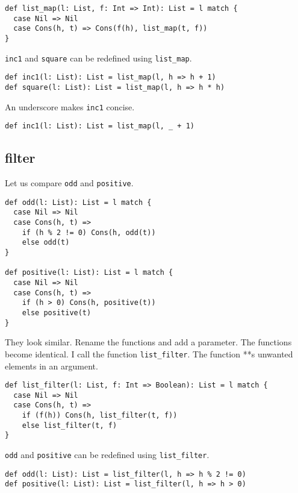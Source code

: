 \begin{verbatim}
def list_map(l: List, f: Int => Int): List = l match {
  case Nil => Nil
  case Cons(h, t) => Cons(f(h), list_map(t, f))
}
\end{verbatim}

\verb!inc1! and \verb!square! can be redefined using \verb!list_map!.

\begin{verbatim}
def inc1(l: List): List = list_map(l, h => h + 1)
def square(l: List): List = list_map(l, h => h * h)
\end{verbatim}

An underscore makes \verb!inc1! concise.

\begin{verbatim}
def inc1(l: List): List = list_map(l, _ + 1)
\end{verbatim}

\subsection{filter}

Let us compare \verb!odd! and \verb!positive!.

\begin{verbatim}
def odd(l: List): List = l match {
  case Nil => Nil
  case Cons(h, t) =>
    if (h % 2 != 0) Cons(h, odd(t))
    else odd(t)
}

def positive(l: List): List = l match {
  case Nil => Nil
  case Cons(h, t) =>
    if (h > 0) Cons(h, positive(t))
    else positive(t)
}
\end{verbatim}

They look similar. Rename the functions and add a parameter. The functions become
identical. I call the function \verb!list_filter!. The function **s
unwanted elements in an argument.

\begin{verbatim}
def list_filter(l: List, f: Int => Boolean): List = l match {
  case Nil => Nil
  case Cons(h, t) =>
    if (f(h)) Cons(h, list_filter(t, f))
    else list_filter(t, f)
}
\end{verbatim}

\verb!odd! and \verb!positive! can be redefined using \verb!list_filter!.

\begin{verbatim}
def odd(l: List): List = list_filter(l, h => h % 2 != 0)
def positive(l: List): List = list_filter(l, h => h > 0)
\end{verbatim}

